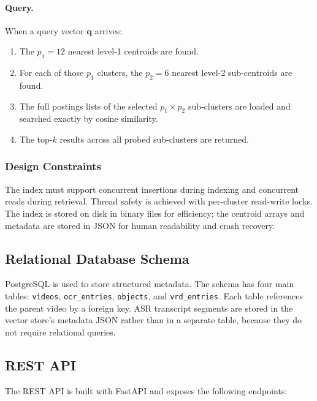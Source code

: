 \documentclass[12pt, a4paper]{report}
\begin{document}
\paragraph{Query.}
When a query vector $\mathbf{q}$ arrives:
\begin{enumerate}
  \item The $p_1 = 12$ nearest level-1 centroids are found.
  \item For each of those $p_1$ clusters, the $p_2 = 6$ nearest level-2
    sub-centroids are found.
  \item The full postings lists of the selected $p_1 \times p_2$ sub-clusters
    are loaded and searched exactly by cosine similarity.
  \item The top-$k$ results across all probed sub-clusters are returned.
\end{enumerate}

\subsubsection{Design Constraints}

The index must support concurrent insertions during indexing and concurrent
reads during retrieval. Thread safety is achieved with per-cluster read-write
locks. The index is stored on disk in binary files for efficiency; the
centroid arrays and metadata are stored in JSON for human readability and
crash recovery.

\subsection{Relational Database Schema}

PostgreSQL is used to store structured metadata. The schema has four main
tables: \texttt{videos}, \texttt{ocr\_entries}, \texttt{objects},
and \texttt{vrd\_entries}. Each table references the parent video by a
foreign key. ASR transcript segments are stored in the vector store's
metadata JSON rather than in a separate table, because they do not require
relational queries.

\subsection{REST API}

The REST API is built with FastAPI and exposes the following endpoints:
\end{document}
